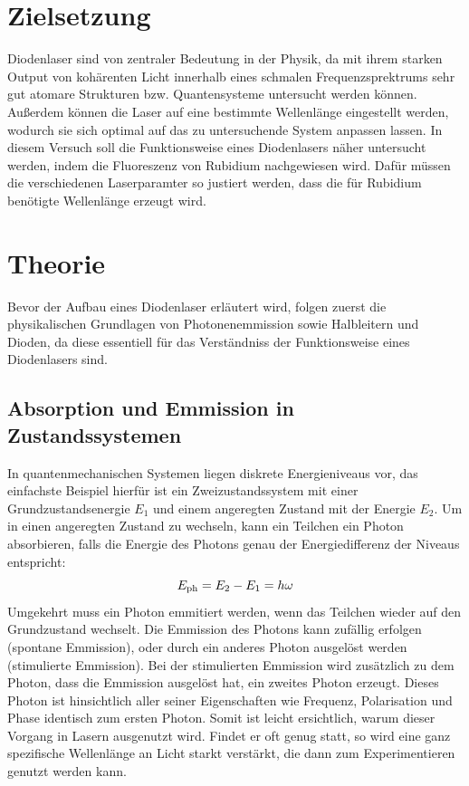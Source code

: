 \section{Zielsetzung}
\label{sec:Zielsetzung}
Diodenlaser sind von zentraler Bedeutung in der Physik, da mit ihrem starken Output von kohärenten
Licht innerhalb eines schmalen Frequenzsprektrums sehr gut atomare Strukturen bzw. Quantensysteme
untersucht werden können. Außerdem können die Laser auf eine bestimmte Wellenlänge eingestellt werden, 
wodurch sie sich optimal auf das zu untersuchende System anpassen lassen.
In diesem Versuch soll die Funktionsweise eines Diodenlasers näher untersucht werden, indem die
Fluoreszenz von Rubidium nachgewiesen wird. Dafür müssen die verschiedenen Laserparamter so justiert werden,
dass die für Rubidium benötigte Wellenlänge erzeugt wird.

\section{Theorie}
\label{sec:Theorie}

Bevor der Aufbau eines Diodenlaser erläutert wird, folgen zuerst die physikalischen Grundlagen von Photonenemmission
sowie Halbleitern und Dioden, da diese essentiell für das Verständniss der Funktionsweise eines Diodenlasers sind.

\subsection{Absorption und Emmission in Zustandssystemen}
\label{sec:sub1}

In quantenmechanischen Systemen liegen diskrete Energieniveaus vor, das einfachste Beispiel hierfür ist ein Zweizustandssystem
mit einer Grundzustandsenergie $E_1$ und einem angeregten Zustand mit der Energie $E_2$. Um in einen
angeregten Zustand zu wechseln, kann ein Teilchen ein Photon absorbieren, falls die Energie des Photons genau der
Energiedifferenz der Niveaus entspricht:
\begin{equation}
    \notag
    E_{\text{ph}} = E_2 - E_1 = h \omega
\end{equation}
Umgekehrt muss ein Photon emmitiert werden, wenn das Teilchen wieder auf den Grundzustand wechselt.
Die Emmission des Photons kann zufällig erfolgen (spontane Emmission), oder durch ein anderes Photon
ausgelöst werden (stimulierte Emmission). Bei der stimulierten Emmission wird zusätzlich zu dem Photon,
dass die Emmission ausgelöst hat, ein zweites Photon erzeugt. Dieses Photon ist hinsichtlich aller seiner
Eigenschaften wie Frequenz, Polarisation und Phase identisch zum ersten Photon. Somit ist leicht
ersichtlich, warum dieser Vorgang in Lasern ausgenutzt wird. Findet er oft genug statt, so wird eine
ganz spezifische Wellenlänge an Licht starkt verstärkt, die dann zum Experimentieren genutzt werden kann.

